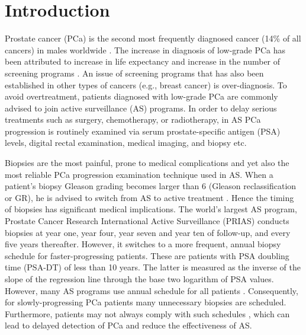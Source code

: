 \section{Introduction}
\label{sec : introduction}
Prostate cancer (PCa) is the second most frequently diagnosed cancer (14\% of all cancers) in males worldwide \citep{GlobalCancerStats2012}. The increase in diagnosis of low-grade PCa has been attributed to increase in life expectancy and increase in the number of screening programs \citep{potoskyPSAcancer}. An issue of screening programs that has also been established in other types of cancers (e.g., breast cancer) is over-diagnosis.  To avoid overtreatment, patients diagnosed with low-grade PCa are commonly advised to join active surveillance (AS) programs. In order to delay serious treatments such as surgery, chemotherapy, or radiotherapy, in AS PCa progression is routinely examined via serum prostate-specific antigen (PSA) levels, digital rectal examination, medical imaging, and biopsy etc.

Biopsies are the most painful, prone to medical complications \citep{loeb2013systematic} and yet also the most reliable PCa progression examination technique used in AS. When a patient's biopsy Gleason grading becomes larger than 6 (Gleason reclassification or GR), he is advised to switch from AS to active treatment \citep{bokhorst2015compliance}. Hence the timing of biopsies has significant medical implications. The world's largest AS program, Prostate Cancer Research International Active Surveillance (PRIAS) conducts biopsies at year one, year four, year seven and year ten of follow-up, and every five years thereafter. However, it switches to a more frequent, annual biopsy schedule for faster-progressing patients. These are patients with PSA doubling time (PSA-DT) of less than 10 years. The latter is measured as the inverse of the slope of the regression line through the base two logarithm of PSA values. However, many AS programs use annual schedule for all patients \citep{tosoian2011active,welty2015extended}. Consequently, for slowly-progressing PCa patients many unnecessary biopsies are scheduled. Furthermore, patients may not always comply with such schedules \citep{bokhorst2015compliance}, which can lead to delayed detection of PCa and reduce the effectiveness of AS.

